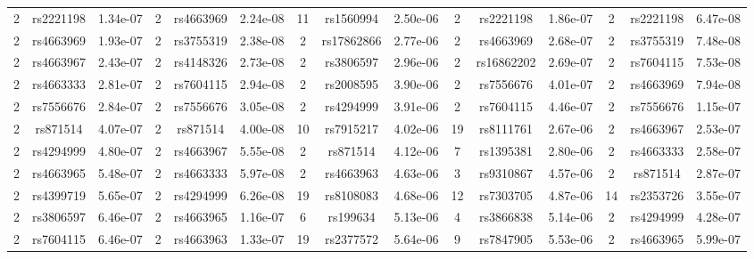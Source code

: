 \documentclass[12pt, usenatbib]{article}
\begin{document}
\begin{table}[ht]
\begin{footnotesize}
{\begin{minipage}{\textwidth}
\begin{tabular}{ccc|ccc|ccc|ccc|ccc}
    2 & rs2221198 & 1.34e-07 &   2 & rs4663969 & 2.24e-08 &  11 & rs1560994 & 2.50e-06 &   2 & rs2221198 & 1.86e-07 &   2 & rs2221198 & 6.47e-08 \\ 
    2 & rs4663969 & 1.93e-07 &   2 & rs3755319 & 2.38e-08 &   2 & rs17862866 & 2.77e-06 &   2 & rs4663969 & 2.68e-07 &   2 & rs3755319 & 7.48e-08 \\ 
    2 & rs4663967 & 2.43e-07 &   2 & rs4148326 & 2.73e-08 &   2 & rs3806597 & 2.96e-06 &   2 & rs16862202 & 2.69e-07 &   2 & rs7604115 & 7.53e-08 \\ 
    2 & rs4663333 & 2.81e-07 &   2 & rs7604115 & 2.94e-08 &   2 & rs2008595 & 3.90e-06 &   2 & rs7556676 & 4.01e-07 &   2 & rs4663969 & 7.94e-08 \\ 
    2 & rs7556676 & 2.84e-07 &   2 & rs7556676 & 3.05e-08 &   2 & rs4294999 & 3.91e-06 &   2 & rs7604115 & 4.46e-07 &   2 & rs7556676 & 1.15e-07 \\ 
    2 & rs871514 & 4.07e-07 &   2 & rs871514 & 4.00e-08 &  10 & rs7915217 & 4.02e-06 &  19 & rs8111761 & 2.67e-06 &   2 & rs4663967 & 2.53e-07 \\ 
    2 & rs4294999 & 4.80e-07 &   2 & rs4663967 & 5.55e-08 &   2 & rs871514 & 4.12e-06 &   7 & rs1395381 & 2.80e-06 &   2 & rs4663333 & 2.58e-07 \\ 
    2 & rs4663965 & 5.48e-07 &   2 & rs4663333 & 5.97e-08 &   2 & rs4663963 & 4.63e-06 &   3 & rs9310867 & 4.57e-06 &   2 & rs871514 & 2.87e-07 \\ 
    2 & rs4399719 & 5.65e-07 &   2 & rs4294999 & 6.26e-08 &  19 & rs8108083 & 4.68e-06 &  12 & rs7303705 & 4.87e-06 &  14 & rs2353726 & 3.55e-07 \\ 
    2 & rs3806597 & 6.46e-07 &   2 & rs4663965 & 1.16e-07 &   6 & rs199634 & 5.13e-06 &   4 & rs3866838 & 5.14e-06 &   2 & rs4294999 & 4.28e-07 \\ 
    2 & rs7604115 & 6.46e-07 &   2 & rs4663963 & 1.33e-07 &  19 & rs2377572 & 5.64e-06 &   9 & rs7847905 & 5.53e-06 &   2 & rs4663965 & 5.99e-07 \\
\hline     %
\end{tabular}
\label{table:combTable} %
\end{minipage} }
\end{footnotesize}
\end{table}
\end{document}
